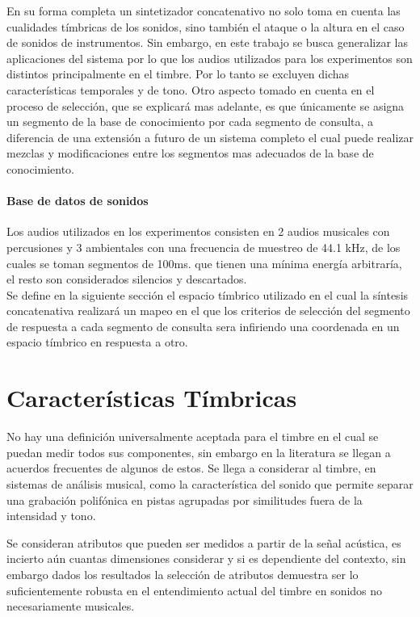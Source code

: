 \documentclass[runningheads]{llncs}
\begin{document}
En su forma completa un sintetizador concatenativo no solo toma en cuenta las cualidades tímbricas de los sonidos, sino también el ataque o la altura en el caso de sonidos de instrumentos. Sin embargo, en este trabajo se busca generalizar las aplicaciones del sistema por lo que los audios utilizados para los experimentos son distintos principalmente en el timbre. Por lo tanto se excluyen dichas características temporales y de tono.
Otro aspecto tomado en cuenta en el proceso de selección, que se explicará mas adelante, es que únicamente se asigna un segmento de la base de conocimiento por cada segmento de consulta, a diferencia de una extensión a futuro de un sistema completo el cual puede realizar mezclas y modificaciones entre los segmentos mas adecuados de la base de conocimiento.
\paragraph{\textbf{Base de datos de sonidos}} Los audios utilizados en los experimentos consisten en 2 audios musicales con percusiones y 3 ambientales con una frecuencia de muestreo de 44.1 kHz, de los cuales se toman segmentos de 100ms. que tienen una mínima energía arbitraría, el resto son considerados silencios y descartados.\\

Se define en la siguiente sección el espacio tímbrico utilizado en el cual la síntesis concatenativa realizará un mapeo en el que los criterios de selección del segmento de respuesta a cada segmento de consulta sera infiriendo una coordenada en un espacio tímbrico en respuesta a otro.

\section{Características Tímbricas}
No hay una definición universalmente aceptada para el timbre en el cual se puedan medir todos sus componentes, sin embargo en la literatura se llegan a acuerdos frecuentes de algunos de estos. Se llega a considerar al timbre, en sistemas de análisis musical, como la característica del sonido que permite separar una grabación polifónica en pistas agrupadas por similitudes fuera de la intensidad y tono. 

Se consideran atributos que pueden ser medidos a partir de la señal acústica, es incierto aún cuantas dimensiones considerar y si es dependiente del contexto, sin embargo dados los resultados la selección de atributos demuestra ser lo suficientemente robusta en el entendimiento actual del timbre en sonidos no necesariamente musicales.
\end{document}
